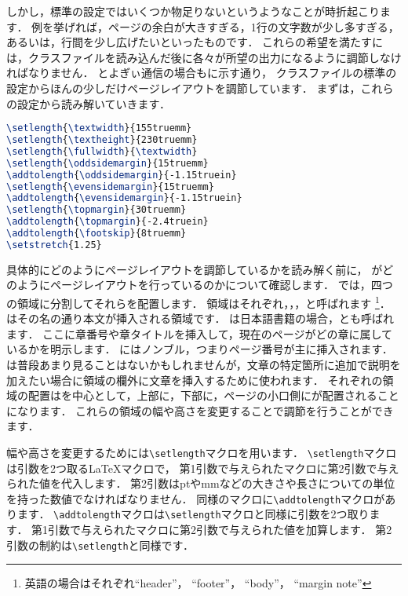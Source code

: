しかし，標準の設定ではいくつか物足りないというようなことが時折起こります．
例を挙げれば，ページの余白が大きすぎる，1行の文字数が少し多すぎる，あるいは，行間を少し広げたいといったものです．
これらの希望を満たすには，クラスファイルを読み込んだ後に各々が所望の出力になるように調節しなければなりません．
とよぎぃ通信の場合もに示す通り，
クラスファイルの標準の設定からほんの少しだけページレイアウトを調節しています．
まずは，これらの設定から読み解いていきます．
\begin{lstlisting}[caption = ページレイアウトの調節,label = list:layout,language = tex]
\setlength{\textwidth}{155truemm}
\setlength{\textheight}{230truemm}
\setlength{\fullwidth}{\textwidth}
\setlength{\oddsidemargin}{15truemm}
\addtolength{\oddsidemargin}{-1.15truein}
\setlength{\evensidemargin}{15truemm}
\addtolength{\evensidemargin}{-1.15truein}
\setlength{\topmargin}{30truemm}
\addtolength{\topmargin}{-2.4truein}
\addtolength{\footskip}{8truemm}
\setstretch{1.25}
\end{lstlisting}

具体的にどのようにページレイアウトを調節しているかを読み解く前に，
{\pLaTeX}がどのようにページレイアウトを行っているのかについて確認します．
{\pLaTeX}では，四つの領域に分割してそれらを配置します．
領域はそれぞれ，，，と呼ばれます
\footnote{英語の場合はそれぞれ``header''， ``footer''， ``body''， ``margin note''}．
はその名の通り本文が挿入される領域です．
は日本語書籍の場合，とも呼ばれます．
ここに章番号や章タイトルを挿入して，現在のページがどの章に属しているかを明示します．
にはノンブル，つまりページ番号が主に挿入されます．
は普段あまり見ることはないかもしれませんが，文章の特定箇所に追加で説明を加えたい場合に領域の欄外に文章を挿入するために使われます．
それぞれの領域の配置はを中心として，上部に，下部に，ページの小口側にが配置されることになります．
これらの領域の幅や高さを変更することで調節を行うことができます．

幅や高さを変更するためには\verb|\setlength|マクロを用います．
\verb|\setlength|マクロは引数を2つ取る{\LaTeX}マクロで，
第1引数で与えられたマクロに第2引数で与えられた値を代入します．
第2引数はptやmmなどの大きさや長さについての単位を持った数値でなければなりません．
同様のマクロに\verb|\addtolength|マクロがあります．
\verb|\addtolength|マクロは\verb|\setlength|マクロと同様に引数を2つ取ります．
第1引数で与えられたマクロに第2引数で与えられた値を加算します．
第2引数の制約は\verb|\setlength|と同様です．


